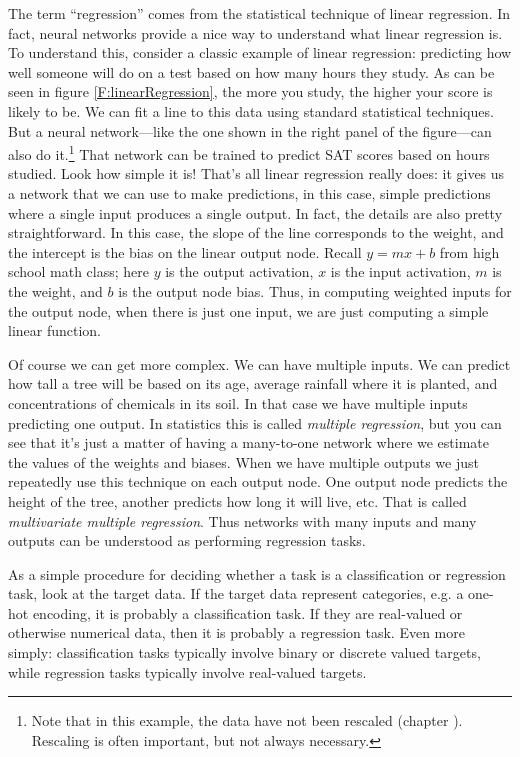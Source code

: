 The term ``regression'' comes from the statistical technique of linear regression. In fact, neural networks provide a nice way to understand what linear regression is. To understand this, consider a classic example of linear regression: predicting how well someone will do on a test based on how many hours they study. As can be seen in figure \ref{F:linearRegression}, the more you study, the higher your score is likely to be. We can fit a line to this data using standard statistical techniques. But a neural network---like the one shown in the right panel of the figure---can also do it.\footnote{Note that in this example, the data have not been rescaled (chapter ). Rescaling is often important, but not always necessary.} That network can be trained to predict SAT scores based on hours studied. Look how simple it is! That's all linear regression really does: it gives us a network that we can use to make predictions, in this case, simple predictions where a single input produces a single output. In fact, the details are also pretty straightforward. In this case, the slope of the line corresponds to the weight, and the intercept is the bias on the linear output node. Recall $y=mx + b$ from high school math class; here $y$ is the output activation, $x$ is the input activation, $m$ is the weight, and $b$ is the output node bias. Thus, in computing weighted inputs for the output node, when there is just one input, we are just computing a simple linear function.

Of course we can get more complex. We can have multiple inputs. We can  predict how tall a tree will be based on its age, average rainfall where it is planted, and concentrations of chemicals in its soil. In that case we have multiple inputs predicting one output. In statistics this is called \emph{multiple regression}, but you can see that it's just a matter of having  a many-to-one network where we estimate the values of the weights and biases. When we have multiple outputs we just repeatedly use this technique on each output node. One output node predicts the height of the tree, another predicts how long it will live, etc. That is called \emph{multivariate multiple regression}. Thus networks with many inputs and many outputs can  be understood as performing regression tasks.

As a simple procedure for deciding whether a task is a classification or regression task, look at the target data. If the target data represent categories, e.g. a one-hot encoding, it is probably a classification task. If they are real-valued or otherwise numerical data, then it is probably a regression task. Even more simply: classification tasks typically involve binary or discrete valued targets, while regression tasks typically involve real-valued targets.

